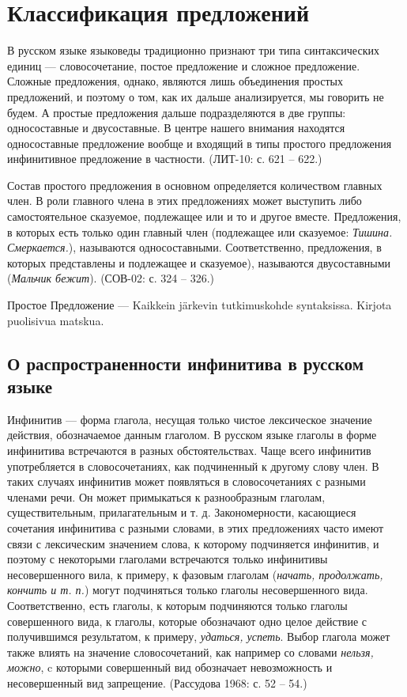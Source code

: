 \section{Классификация предложений}

В русском языке языковеды традиционно признают три типа синтаксических единиц --- словосочетание, постое предложение и сложное предложение. Сложные предложения, однако, являются лишь объединения простых предложений, и поэтому о том, как их дальше анализируется, мы говорить не будем. А простые предложения дальше подразделяются в две группы: односоставные и двусоставные. В центре нашего внимания находятся односоставные предложение вообще и входящий в типы простого предложения инфинитивное предложение в частности. (ЛИТ-10: с. 621 -- 622.)

Состав простого предложения в основном определяется количеством главных член. В роли главного члена в этих предложениях может выступить либо самостоятельное сказуемое, подлежащее или и то и другое вместе. Предложения, в которых есть только один главный член (подлежащее или сказуемое: \textit{Тишина. Смеркается.}), называются односоставными. Соответственно, предложения, в которых представлены и подлежащее и сказуемое), называются двусоставными (\textit{Мальчик бежит}). (СОВ-02: с. 324 -- 326.)

Простое Предложение --- Kaikkein järkevin tutkimuskohde syntaksissa. Kirjota puolisivua matskua.





\subsection{О распространенности инфинитива в русском языке}

Инфинитив --- форма глагола, несущая только чистое лексическое значение действия, обозначаемое данным глаголом. В русском языке глаголы в форме инфинитива встречаются в разных обстоятельствах. Чаще всего инфинитив употребляется в словосочетаниях, как подчиненный к другому слову член. В таких случаях инфинитив может появляться в словосочетаниях с разными членами речи. Он может примыкаться к разнообразным глаголам, существительным, прилагательным и т. д. Закономерности, касающиеся сочетания инфинитива с разными словами, в этих предложениях часто имеют связи с лексическим значением слова, к которому подчиняется инфинитив, и поэтому с некоторыми глаголами встречаются только инфинитивы несовершенного вила, к примеру, к фазовым глаголам (\textit{начать, продолжать, кончить и т. п.}) могут подчиняться только глаголы несовершенного вида. Соответственно, есть глаголы, к которым подчиняются только глаголы совершенного вида, к глаголы, которые обозначают одно целое действие с получившимся результатом, к примеру, \textit{удаться, успеть}. Выбор глагола может также влиять на значение словосочетаний, как например со словами \textit{нельзя, можно}, c которыми совершенный вид обозначает невозможность и несовершенный вид запрещение. (Рассудова 1968: с. 52 -- 54.)


